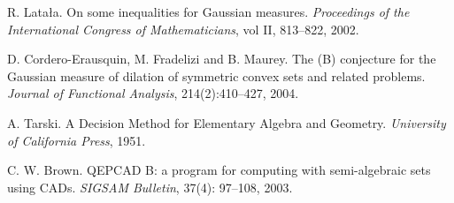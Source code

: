 \documentclass[a4paper,10pt,twoside,reqno,intlimits]{amsart}
\begin{document}
\begin{thebibliography}{100}

R. Lata{\l}a.
\newblock On some inequalities for Gaussian measures.
\newblock \emph{Proceedings of the International Congress of Mathematicians}, vol II, 813--822, 2002.

D. Cordero-Erausquin, M. Fradelizi and B. Maurey.
\newblock The (B) conjecture for the Gaussian measure of dilation of symmetric convex sets and related problems.
\newblock \emph{Journal of Functional Analysis}, 214(2):410--427, 2004.

A. Tarski.
\newblock A Decision Method for Elementary Algebra and Geometry.
\newblock \emph{University of California Press}, 1951.

C. W. Brown.
\newblock QEPCAD B: a program for computing with semi-algebraic sets using CADs.
\newblock \emph{SIGSAM Bulletin}, 37(4): 97--108, 2003.

\end{thebibliography}
\end{document}

